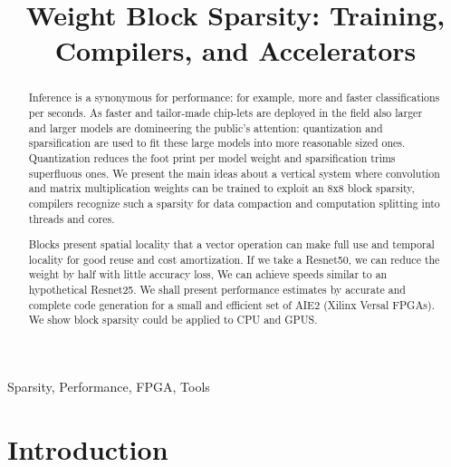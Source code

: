 \documentclass[conference]{IEEEtran}
\begin{document}
\title{Weight Block Sparsity: Training, Compilers, and Accelerators  }

\author{
  \and
  \and
  \and
  \and
  \and
  \and
}

\maketitle

\begin{abstract}
Inference is a synonymous for performance: for example, more and
faster classifications per seconds. As faster and tailor-made
chip-lets are deployed in the field also larger and larger models are
domineering the public's attention: quantization and sparsification
are used to fit these large models into more reasonable sized
ones. Quantization reduces the foot print per model weight and
sparsification trims superfluous ones.  We present the main ideas
about a vertical system where convolution and matrix multiplication
weights can be trained to exploit an 8x8 block sparsity, compilers
recognize such a sparsity for data compaction and computation
splitting into threads and cores.

Blocks present spatial locality that a vector operation can make full
use and temporal locality for good reuse and cost amortization. If we
take a Resnet50, we can reduce the weight by half with little accuracy
loss, We can achieve speeds similar to an hypothetical Resnet25. We
shall present performance estimates by accurate and complete code
generation for a small and efficient set of AIE2 (Xilinx Versal
FPGAs). We show block sparsity could be applied to  CPU and  GPUS.

\end{abstract}


\begin{IEEEkeywords}
Sparsity, Performance, FPGA, Tools
\end{IEEEkeywords}

\section{Introduction}
\label{sec:introduction}
\end{document}
